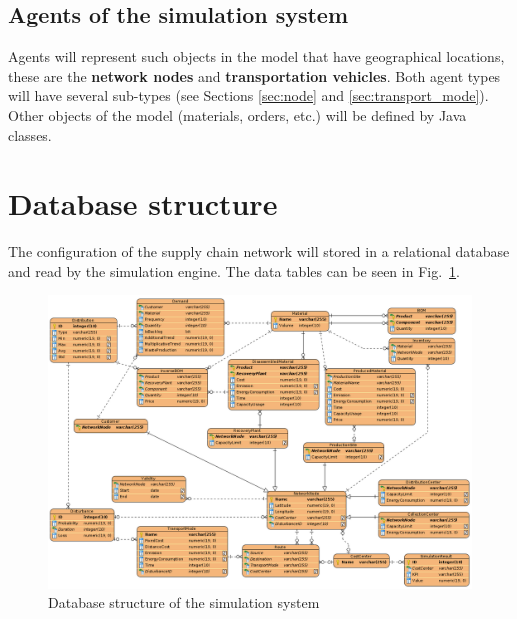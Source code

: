 \documentclass{article}
\begin{document}
\subsection{Agents of the simulation system}

Agents will represent such objects in the model that have geographical locations, these are the \textbf{network nodes} and \textbf{transportation vehicles}. Both agent types will have several sub-types (see Sections \ref{sec:node} and \ref{sec:transport_mode}). Other objects of the model (materials, orders, etc.) will be defined by Java classes.


\section{Database structure}

The configuration of the supply chain network will stored in a relational database and read by the simulation engine. The data tables can be seen in Fig.~\ref{fig:datamodel}.

\begin{figure}[ht!]
	\center
	\includegraphics[height=\textwidth,angle=90,origin=c]{datamodel.png} 
	\caption{Database structure of the simulation system}\label{fig:datamodel}
\end{figure}
\end{document}
